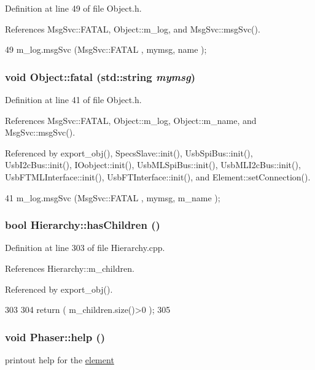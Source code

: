 Definition at line 49 of file Object.h.

References MsgSvc::FATAL, Object::m\_\-log, and MsgSvc::msgSvc().


\begin{DoxyCode}
49 { m_log.msgSvc (MsgSvc::FATAL   , mymsg, name ); }
\end{DoxyCode}
\hypertarget{classObject_aad5a16aac7516ce65bd5ec02ab07fc80}{
\subsubsection[{fatal}]{\setlength{\rightskip}{0pt plus 5cm}void Object::fatal (std::string {\em mymsg})}}
\label{classObject_aad5a16aac7516ce65bd5ec02ab07fc80}


Definition at line 41 of file Object.h.

References MsgSvc::FATAL, Object::m\_\-log, Object::m\_\-name, and MsgSvc::msgSvc().

Referenced by export\_\-obj(), SpecsSlave::init(), UsbSpiBus::init(), UsbI2cBus::init(), IOobject::init(), UsbMLSpiBus::init(), UsbMLI2cBus::init(), UsbFTMLInterface::init(), UsbFTInterface::init(), and Element::setConnection().


\begin{DoxyCode}
41 { m_log.msgSvc (MsgSvc::FATAL   , mymsg, m_name ); }
\end{DoxyCode}
\hypertarget{classHierarchy_a255174fe4d316d2a3f430dcb9dab29f1}{
\subsubsection[{hasChildren}]{\setlength{\rightskip}{0pt plus 5cm}bool Hierarchy::hasChildren ()}}
\label{classHierarchy_a255174fe4d316d2a3f430dcb9dab29f1}


Definition at line 303 of file Hierarchy.cpp.

References Hierarchy::m\_\-children.

Referenced by export\_\-obj().


\begin{DoxyCode}
303                               {
304   return ( m_children.size()>0 );
305 }
\end{DoxyCode}
\hypertarget{classPhaser_a0f122559297d076500420a7ceb21d70d}{
\subsubsection[{help}]{\setlength{\rightskip}{0pt plus 5cm}void Phaser::help ()}}
\label{classPhaser_a0f122559297d076500420a7ceb21d70d}
printout help for the \hyperlink{namespaceelement}{element} 

